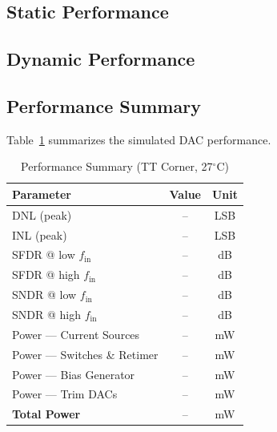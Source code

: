 \documentclass[lettersize,journal]{IEEEtran}
\begin{document}
\subsection{Static Performance}


\subsection{Dynamic Performance}


\subsection{Performance Summary}

Table~\ref{tab:perf} summarizes the simulated DAC performance.

\begin{table}[!h]
  \renewcommand{\arraystretch}{1.2}
  \caption{Performance Summary (TT Corner, 27$^\circ$C)}
  \label{tab:perf}
  \centering
  \begin{tabular}{lcc}
    \toprule
    \textbf{Parameter} & \textbf{Value} & \textbf{Unit} \\
    \midrule
    DNL (peak)                           & -- & LSB \\
    INL (peak)                           & -- & LSB \\
    SFDR @ low $f_\text{in}$             & -- & dB  \\
    SFDR @ high $f_\text{in}$            & -- & dB  \\
    SNDR @ low $f_\text{in}$             & -- & dB  \\
    SNDR @ high $f_\text{in}$            & -- & dB  \\
    \midrule
    Power — Current Sources              & -- & mW  \\
    Power — Switches \& Retimer          & -- & mW  \\
    Power — Bias Generator               & -- & mW  \\
    Power — Trim DACs                    & -- & mW  \\
    \textbf{Total Power}                 & -- & mW  \\
    \bottomrule
  \end{tabular}
\end{table}
\end{document}
